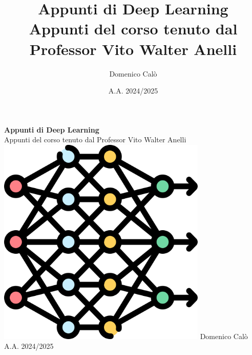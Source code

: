 \documentclass[a4paper,12pt]{book} %
\title{\textbf{Appunti di Deep Learning}\\
    \vspace{0.5cm}
    {\LARGE Appunti del corso tenuto dal Professor Vito Walter Anelli}}
\author{Domenico Calò}
\date{A.A. 2024/2025}
\begin{document}
\begin{titlepage}
    \begin{center}
        \vspace*{2cm}
        {\Huge \textbf{Appunti di Deep Learning}}\\
        \vspace{0.5cm}
        {\LARGE Appunti del corso tenuto dal Professor Vito Walter Anelli}
        \vfill
        \includegraphics[width=0.75\textwidth]{figure/dlogo.png}
        \vfill
        {\Large Domenico Calò}\\
        \vspace{0.5cm}
        {\large A.A. 2024/2025}
        \vspace*{2cm}
    \end{center}
\end{titlepage}


\tableofcontents
\listoffigures
\listoftables
\newpage

















\printbibliography
\end{document}
